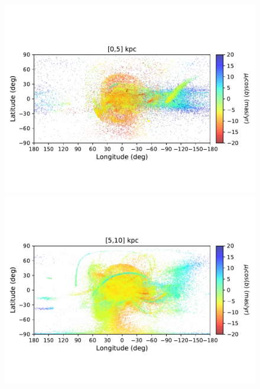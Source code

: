 \begin{figure}[h!]
\begin{center}
            \includegraphics[clip=true, trim = 0mm 20mm 0mm 20mm, width=\columnwidth]{images/PII_ensemble_LB_D0-5_PML_new.pdf}
            \includegraphics[clip=true, trim = 0mm 20mm 0mm 20mm, width=\columnwidth]{images/PII_ensemble_LB_D5-10_PML_new.pdf}


\end{center}
\end{figure}
